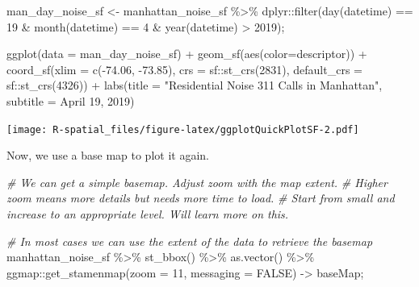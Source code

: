 \documentclass[
  11pt,
]{book}
\newenvironment{Shaded}{\begin{snugshade}}{\end{snugshade}}
\newcommand{\AttributeTok}[1]{\textcolor[rgb]{0.77,0.63,0.00}{#1}}
\newcommand{\CommentTok}[1]{\textcolor[rgb]{0.56,0.35,0.01}{\textit{#1}}}
\newcommand{\ConstantTok}[1]{\textcolor[rgb]{0.00,0.00,0.00}{#1}}
\newcommand{\DecValTok}[1]{\textcolor[rgb]{0.00,0.00,0.81}{#1}}
\newcommand{\FloatTok}[1]{\textcolor[rgb]{0.00,0.00,0.81}{#1}}
\newcommand{\FunctionTok}[1]{\textcolor[rgb]{0.00,0.00,0.00}{#1}}
\newcommand{\NormalTok}[1]{#1}
\newcommand{\OtherTok}[1]{\textcolor[rgb]{0.56,0.35,0.01}{#1}}
\newcommand{\SpecialCharTok}[1]{\textcolor[rgb]{0.00,0.00,0.00}{#1}}
\newcommand{\StringTok}[1]{\textcolor[rgb]{0.31,0.60,0.02}{#1}}
\begin{document}
\begin{Shaded}
\begin{Highlighting}[]
\NormalTok{man\_day\_noise\_sf }\OtherTok{\textless{}{-}}\NormalTok{ manhattan\_noise\_sf  }\SpecialCharTok{\%\textgreater{}\%} 
\NormalTok{         dplyr}\SpecialCharTok{::}\FunctionTok{filter}\NormalTok{(}\FunctionTok{day}\NormalTok{(datetime) }\SpecialCharTok{==} \DecValTok{19} \SpecialCharTok{\&} \FunctionTok{month}\NormalTok{(datetime) }\SpecialCharTok{==} \DecValTok{4} \SpecialCharTok{\&} \FunctionTok{year}\NormalTok{(datetime) }\SpecialCharTok{\textgreater{}} \DecValTok{2019}\NormalTok{); }

\FunctionTok{ggplot}\NormalTok{(}\AttributeTok{data =}\NormalTok{ man\_day\_noise\_sf) }\SpecialCharTok{+}
  \FunctionTok{geom\_sf}\NormalTok{(}\FunctionTok{aes}\NormalTok{(}\AttributeTok{color=}\NormalTok{descriptor)) }\SpecialCharTok{+}
  \FunctionTok{coord\_sf}\NormalTok{(}\AttributeTok{xlim =}  \FunctionTok{c}\NormalTok{(}\SpecialCharTok{{-}}\FloatTok{74.06}\NormalTok{, }\SpecialCharTok{{-}}\FloatTok{73.85}\NormalTok{), }\AttributeTok{crs =}\NormalTok{ sf}\SpecialCharTok{::}\FunctionTok{st\_crs}\NormalTok{(}\DecValTok{2831}\NormalTok{), }\AttributeTok{default\_crs =}\NormalTok{ sf}\SpecialCharTok{::}\FunctionTok{st\_crs}\NormalTok{(}\DecValTok{4326}\NormalTok{)) }\SpecialCharTok{+}
  \FunctionTok{labs}\NormalTok{(}\AttributeTok{title =} \StringTok{"Residential Noise 311 Calls in Manhattan"}\NormalTok{, }\AttributeTok{subtitle =} \StringTok{\textquotesingle{}April 19, 2019\textquotesingle{}}\NormalTok{)}
\end{Highlighting}
\end{Shaded}

\texttt{[image: R-spatial\_files/figure-latex/ggplotQuickPlotSF-2.pdf]}

Now, we use a base map to plot it again.

\begin{Shaded}
\begin{Highlighting}[]
\CommentTok{\# We can get a simple basemap. Adjust zoom with the map extent. }
\CommentTok{\# Higher zoom means more details but needs more time to load.}
\CommentTok{\# Start from small and increase to an appropriate level. Will learn more on this.}

\CommentTok{\# In most cases we can use the extent of the data to retrieve the basemap}
\NormalTok{manhattan\_noise\_sf }\SpecialCharTok{\%\textgreater{}\%} \FunctionTok{st\_bbox}\NormalTok{() }\SpecialCharTok{\%\textgreater{}\%} \FunctionTok{as.vector}\NormalTok{() }\SpecialCharTok{\%\textgreater{}\%}
\NormalTok{  ggmap}\SpecialCharTok{::}\FunctionTok{get\_stamenmap}\NormalTok{(}\AttributeTok{zoom =} \DecValTok{11}\NormalTok{, }\AttributeTok{messaging =} \ConstantTok{FALSE}\NormalTok{) }\OtherTok{{-}\textgreater{}}\NormalTok{ baseMap;}
\end{Highlighting}
\end{Shaded}
\end{document}
